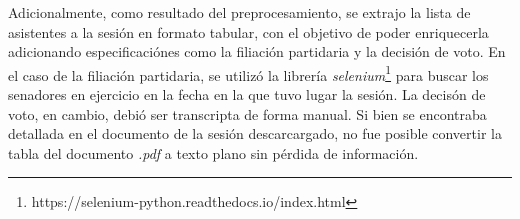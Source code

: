 \par
Adicionalmente, como resultado del preprocesamiento, se extrajo la lista de
asistentes a la sesión en formato tabular, con el objetivo de poder
enriquecerla adicionando especificaciónes como la filiación partidaria y la
decisión de voto. En el caso de la filiación partidaria, se utilizó la
librería \textit{selenium}\footnote{https://selenium-python.readthedocs.io/index.html}
para buscar los senadores en ejercicio en la fecha en la que tuvo lugar la sesión.
La decisón de voto, en cambio, debió ser transcripta de forma manual. Si bien
se encontraba detallada en el documento de la sesión descarcargado, no fue posible convertir
la tabla del documento \textit{.pdf} a texto plano sin pérdida de información.
